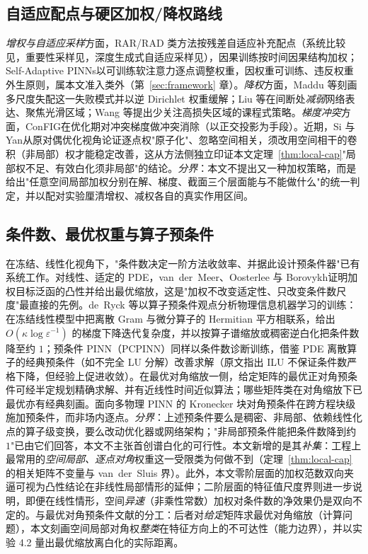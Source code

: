 \documentclass[fontset=windows,11pt]{ctexart}
\numberwithin{equation}{section}
\begin{document}
\subsection{自适应配点与硬区加权/降权路线}\label{sec:rel-weight}
\emph{增权与自适应采样}方面，RAR/RAD 类方法按残差自适应补充配点（系统比较见\cite{Wu2022}，重要性采样见\cite{Nabian2021}，深度生成式自适应采样见\cite{TangDAS2023}），因果训练\cite{Wang2022causal}按时间因果结构加权；Self-Adaptive PINNs\cite{McClenny2020}以可训练软注意力逐点调整权重，因权重可训练、违反权重外生原则，属本文准入类外（第~\ref{sec:framework} 章）。\emph{降权}方面，Maddu 等\cite{Maddu2021}刻画多尺度失配这一失败模式并以逆 Dirichlet 权重缓解；Liu 等\cite{Liu2022down}在间断处\emph{减弱}网络表达、聚焦光滑区域；Wang 等\cite{LessEmphasis2022}提出少关注高损失区域的课程式策略。\emph{梯度冲突}方面，ConFIG\cite{ConFIG2025}在优化期对冲突梯度做冲突消除（以正交投影为手段）。近期，Si 与 Yan\cite{SiYan2025}从原对偶优化视角论证逐点权"原子化"、忽略空间相关，须改用空间相干的卷积（非局部）权才能稳定改善，这从方法侧独立印证本文定理~\ref{thm:local-cap}"局部权不足、有效白化须非局部"的结论。\emph{分界}：本文不提出又一种加权策略，而是给出"任意空间局部加权分别在解、梯度、截面三个层面能与不能做什么"的统一判定，并以配对实验厘清增权、减权各自的真实作用区间。

\subsection{条件数、最优权重与算子预条件}\label{sec:rel-precond}
在冻结、线性化视角下，"条件数决定一阶方法收敛率、并据此设计预条件器"已有系统工作。对线性、适定的 PDE，van~der~Meer、Oosterlee 与 Borovykh\cite{vanDerMeer2020}证明加权目标泛函的凸性并给出最优缩放，这是"加权不改变适定性、只改变条件数尺度"最直接的先例。de~Ryck 等\cite{deRyckOp2024}以算子预条件观点分析物理信息机器学习的训练：在冻结线性模型中把离散 Gram 与微分算子的 Hermitian 平方相联系，给出 $O(\kappa\log\varepsilon^{-1})$ 的梯度下降迭代复杂度，并以按算子谱缩放或稠密逆白化把条件数降至约 $1$；预条件 PINN（PCPINN\cite{PCPINN2024}）同样以条件数诊断训练，借鉴 PDE 离散算子的经典预条件（如不完全 LU 分解）改善求解（原文指出 ILU 不保证条件数严格下降，但经验上促进收敛）。在最优对角缩放一侧，给定矩阵的最优正对角预条件可经半定规划精确求解、并有近线性时间近似算法\cite{Qu2025ODP,Jambulapati2020,Gao2024SODP}；哪些矩阵类在对角缩放下已最优亦有经典刻画\cite{ForsytheStraus1955,Shapiro1982,LivneGolub2004}。面向多物理 PINN 的 Kronecker 块对角预条件\cite{KroneckerPINN2026}在跨方程块级施加预条件，而非场内逐点。\emph{分界}：上述预条件要么是稠密、非局部、依赖线性化点的算子级变换，要么改动优化器或网络架构；"非局部预条件能把条件数降到约 $1$"已由它们回答，本文不主张首创谱白化的可行性。本文新增的是其\emph{补集}：工程上最常用的\emph{空间局部、逐点对角}权重这一受限类为何做不到（定理~\ref{thm:local-cap} 的相关矩阵不变量与 van~der~Sluis 界）。此外，本文零阶层面的加权范数双向夹逼可视为\cite{vanDerMeer2020}凸性结论在非线性局部情形的延伸；二阶层面的特征值尺度界则进一步说明，即便在线性情形，空间\emph{异速}（非乘性常数）加权对条件数的净效果仍是双向不定的。与最优对角预条件文献的分工：后者对\emph{给定}矩阵求最优对角缩放（计算问题），本文刻画空间局部对角权\emph{整类}在特征方向上的不可达性（能力边界），并以实验 4.2 量出最优缩放离白化的实际距离。
\end{document}
